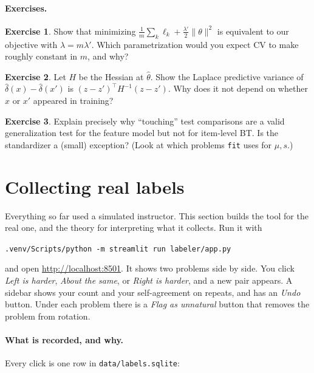 \documentclass[11pt]{article}
\theoremstyle{definition}
\newtheorem{exercise}{Exercise}[section]
\theoremstyle{plain}
\theoremstyle{remark}
\newcommand{\code}[1]{\texttt{#1}}
\renewcommand{\_}{\oldunderscore\allowbreak}
\newcommand{\file}[1]{\textcolor{blue!50!black}{\texttt{#1}}}
\begin{document}
\paragraph{Exercises.}
\begin{exercise}
Show that minimizing $\frac1m\sum_k\ell_k+\frac{\lambda'}2\|\theta\|^2$ is equivalent to our objective with $\lambda=m\lambda'$. Which
parametrization would you expect CV to make roughly constant in $m$, and why?
\end{exercise}
\begin{exercise}
Let $H$ be the Hessian at $\hat\theta$. Show the Laplace predictive variance of $\hat\delta(x)-\hat\delta(x')$ is
$(z-z')^\top H^{-1}(z-z')$. Why does it not depend on whether $x$ or $x'$ appeared in training?
\end{exercise}
\begin{exercise}
Explain precisely why ``touching'' test comparisons are a valid generalization test for the feature model but not for
item-level BT. Is the standardizer a (small) exception? (Look at which problems \code{fit} uses for $\mu,s$.)
\end{exercise}

\section{Collecting real labels}
\label{sec:labels}

Everything so far used a simulated instructor. This section builds the tool for the real one, and the theory for interpreting what it
collects. Run it with
\begin{center}
\verb|.venv/Scripts/python -m streamlit run labeler/app.py|
\end{center}
and open \url{http://localhost:8501}. It shows two problems side by side. You click \emph{Left is harder}, \emph{About the same},
or \emph{Right is harder}, and a new pair appears. A sidebar shows your count and your self-agreement on repeats, and has
an \emph{Undo} button. Under each problem there is a \emph{Flag as unnatural} button that removes the problem from rotation.

\paragraph{What is recorded, and why.}
Every click is one row in \file{data/labels.sqlite}:
\end{document}
